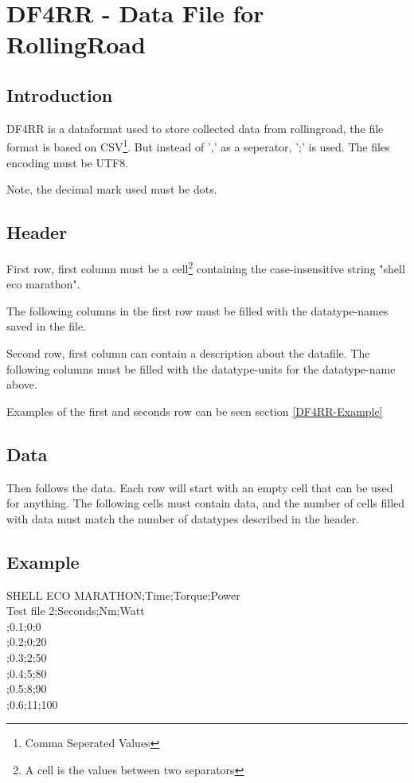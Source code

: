 \section{DF4RR - Data File for RollingRoad}

\subsection{Introduction}

DF4RR is a dataformat used to store collected data from rollingroad, the file format is based on CSV\footnote{Comma Seperated Values}\cite{CSVFileDescription}. But instead of ',' as a seperator, ';' is used. The files encoding must be UTF8\cite{UTF8Description}.

Note, the decimal mark used must be dots.

\subsection{Header}

First row, first column must be a cell\footnote{A cell is the values between two separators} containing the case-insensitive string "shell eco marathon".

The following columns in the first row must be filled with the datatype-names saved in the file.

Second row, first column can contain a description about the datafile. The following columns must be filled with the datatype-units for the datatype-name above. 

Examples of the first and seconds row can be seen section \vref{DF4RR-Example}

\subsection{Data}

Then follows the data. Each row will start with an empty cell that can be used for anything. The following cells must contain data, and the number of cells filled with data must match the number of datatypes described in the header. 

\subsection{Example}
\label{DF4RR-Example}

SHELL ECO MARATHON;Time;Torque;Power\\
Test file 2;Seconds;Nm;Watt\\
;0.1;0;0\\
;0.2;0;20\\
;0.3;2;50\\
;0.4;5;80\\
;0.5;8;90\\
;0.6;11;100\\
